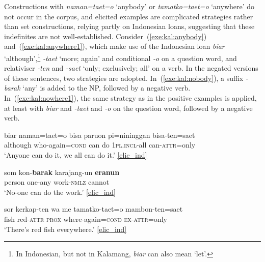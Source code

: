 \documentclass[output=paper,colorlinks,citecolor=brown,draft]{langscibook}
\begin{document}




Constructions with \textit{naman=taet=o} `anybody' or \textit{tamatko=taet=o} `anywhere' do not occur in the corpus, and elicited examples are complicated strategies rather than set constructions, relying partly on Indonesian loans, suggesting that these indefinites are not well-established. Consider~(\ref{exe:kal:anybody}) and~(\ref{exe:kal:anywhere1}), which make use of the Indonesian loan \textit{biar} `although',\footnote{In Indonesian, but not in Kalamang, \textit{biar} can also mean `let'.} \textit{-taet} `more; again' and conditional \textit{-o} on a question word, and relativiser \textit{-ten} and \textit{-saet} `only; exclusively; all' on a verb. In the negated versions of these sentences, two strategies are adopted. In~(\ref{exe:kal:nobody}), a suffix \textit{-barak} `any' is added to the NP, followed by a negative verb. In~(\ref{exe:kal:nowhere1}), the same strategy as in the positive examples is applied, at least with \textit{biar} and \textit{-taet} and \textit{-o} on the question word, followed by a negative verb.

\ea \label{exe:kal:anybnob}
\ea \label{exe:kal:anybody}{
	\gll biar naman=taet=o bisa paruon pi=nininggan bisa-ten=saet\\
	although who-again=\textsc{cond} can do \textsc{1pl.incl}-all can-\textsc{attr}=only\\
	\glt `Anyone can do it, we all can do it.' {\href{http://hdl.handle.net/10050/00-0000-0000-0004-1C60-A}{[elic\_ind]}}}

\ex \label{exe:kal:nobody}{
	\gll som kon-\textbf{barak} karajang-un \textbf{eranun}\\
	person one-any work-\textsc{nmlz} cannot\\
	\glt `No-one can do the work.' {\href{http://hdl.handle.net/10050/00-0000-0000-0004-1C60-A}{[elic\_ind]}}}
\z \z 

\ea \label{exe:kal:anywhnowh}
\ea \label{exe:kal:anywhere1}{
	\gll sor kerkap-ten wa me tamatko-taet=o mambon-ten=saet\\
	fish red-\textsc{attr} \textsc{prox} {\glme} where-again=\textsc{cond} \textsc{ex}-\textsc{attr}=only\\
	\glt `There's red fish everywhere.' {\href{http://hdl.handle.net/10050/00-0000-0000-0004-1C60-A}{[elic\_ind]}}}
\end{document}
